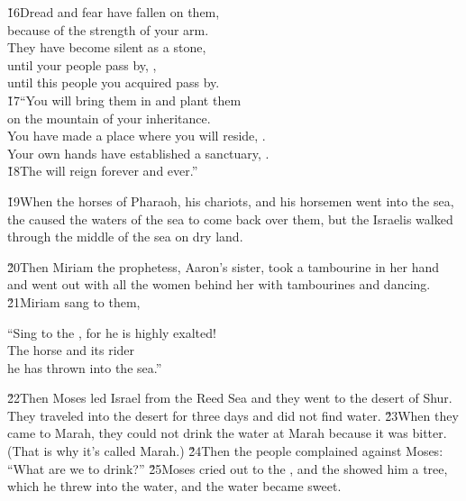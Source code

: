 \begin{poetry}
\poeml \v{16}Dread and fear have fallen on them, \\
\poemll    because of the strength of your arm. \\
\poeml They have become silent as a stone, \\
\poemll    until your people pass by, , \\
\poemlll       until this people you acquired pass by. \\
\poeml \v{17}``You will bring them in and plant them \\
\poemll    on the mountain of your inheritance. \\
\poeml You have made a place where you will reside, . \\
\poemll    Your own hands have established a sanctuary, . \\
\poeml \v{18}The  will reign forever and ever.''
\end{poetry}

\v{19}When the horses of Pharaoh, his chariots, and his horsemen went into the sea, the  caused the waters of the sea to come back over them, but the Israelis walked through the middle of the sea on dry land.

\v{20}Then Miriam the prophetess, Aaron's sister, took a tambourine in her hand and went out with all the women behind her with tambourines and dancing. \v{21}Miriam sang to them,

\begin{poetry}
\poeml ``Sing to the , for he is highly exalted! \\
\poemll    The horse and its rider \\
\poemlll       he has thrown into the sea.''
\end{poetry}

\v{22}Then Moses led Israel from the Reed Sea and they went to the desert of Shur. They traveled into the desert for three days and did not find water. \v{23}When they came to Marah, they could not drink the water at Marah because it was bitter. (That is why it's called Marah.) \v{24}Then the people complained against Moses: ``What are we to drink?'' \v{25}Moses cried out to the , and the  showed him a tree, which he threw into the water, and the water became sweet.

